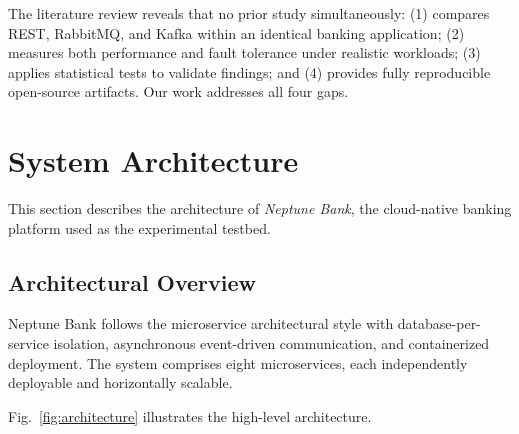 \documentclass[journal]{IEEEtran}
\begin{document}
The literature review reveals that no prior study simultaneously: (1) compares REST, RabbitMQ, and Kafka within an identical banking application; (2) measures both performance and fault tolerance under realistic workloads; (3) applies statistical tests to validate findings; and (4) provides fully reproducible open-source artifacts. Our work addresses all four gaps.


\section{System Architecture}
\label{sec:architecture}

This section describes the architecture of \textit{Neptune Bank}, the cloud-native banking platform used as the experimental testbed.

\subsection{Architectural Overview}
\label{subsec:arch_overview}

Neptune Bank follows the microservice architectural style with database-per-service isolation, asynchronous event-driven communication, and containerized deployment. The system comprises eight microservices, each independently deployable and horizontally scalable.

Fig.~\ref{fig:architecture} illustrates the high-level architecture.
\end{document}
